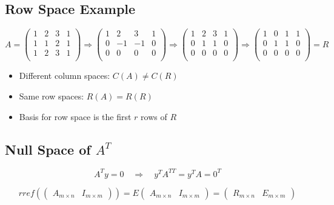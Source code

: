 \documentclass[12pt]{article}
\begin{document}
\subsection{Row Space Example}

\[
A=
\left(
    \begin{matrix}
        1 & 2 & 3 & 1\\
        1 & 1 & 2 & 1\\
        1 & 2 & 3 & 1\\
    \end{matrix}
\right)
\Rightarrow
\left(
    \begin{matrix}
        1 & 2 & 3 & 1\\
        0 & -1 & -1 & 0\\
        0 & 0 & 0 & 0\\
    \end{matrix}
\right)
\Rightarrow
\left(
    \begin{matrix}
        1 & 2 & 3 & 1\\
        0 & 1 & 1 & 0\\
        0 & 0 & 0 & 0\\
    \end{matrix}
\right)
\Rightarrow
\left(
    \begin{matrix}
        \boxed{1} & 0 & 1 & 1\\
        0 & \boxed{1} & 1 & 0\\
        0 & 0 & 0 & 0\\
    \end{matrix}
\right)
=R
\]

\begin{itemize}
    \item Different column spaces: $C(A) \neq C(R)$
    \item Same row spaces: $R(A) = R(R)$
    \item Basis for row space is the first $r$ rows of $R$
\end{itemize}

\subsection{Null Space of $A^T$}

\[
A^{T}y=0
\quad
\Rightarrow
\quad
y^{T}A^{TT}=y^{T}A=0^T
\]

\[
rref(
\left(
    \begin{array}{c|c}
        A_{m\times{n}} & I_{m\times{m}}
    \end{array}
\right)
)=E
\left(
    \begin{array}{c|c}
        A_{m\times{n}} & I_{m\times{m}}
    \end{array}
\right)
=
\left(
    \begin{array}{c|c}
        R_{m\times{n}} & E_{m\times{m}}
    \end{array}
\right)
\]
\end{document}

